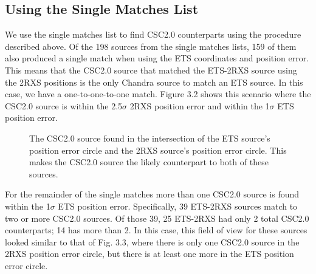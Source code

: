 \subsection{Using the Single Matches List}

We use the single matches list to find CSC2.0 counterparts using the procedure described above. 
Of the 198 sources from the single matches lists, 159 of them also produced a single match when using the ETS coordinates and position error. 
This means that the CSC2.0 source that matched the ETS-2RXS source using the 2RXS positions is the only Chandra source to match an ETS source.
In this case, we have a one-to-one-to-one match.
Figure 3.2 shows this scenario where the CSC2.0 source is within the 2.5$\sigma$ 2RXS position error and within the 1$\sigma$ ETS position error.


\begin{figure}[H]
\centering
{}
\caption{The CSC2.0 source found in the intersection of the ETS source's position error circle and the 2RXS source's position error circle. This makes the CSC2.0 source the likely counterpart to both of these sources. }
\label{imbeded_fb}
\end{figure}

For the remainder of the single matches more than one CSC2.0 source is found within the 1$\sigma$ ETS position error. 
Specifically, 39 ETS-2RXS sources match to two or more CSC2.0 sources.
Of those 39, 25 ETS-2RXS had only 2 total CSC2.0 counterparts; 14 has more than 2.
In this case, this field of view for these sources looked similar to that of Fig. 3.3, where there is only one CSC2.0 source in the 2RXS position error circle, but there is at least one more in the ETS position error circle.

